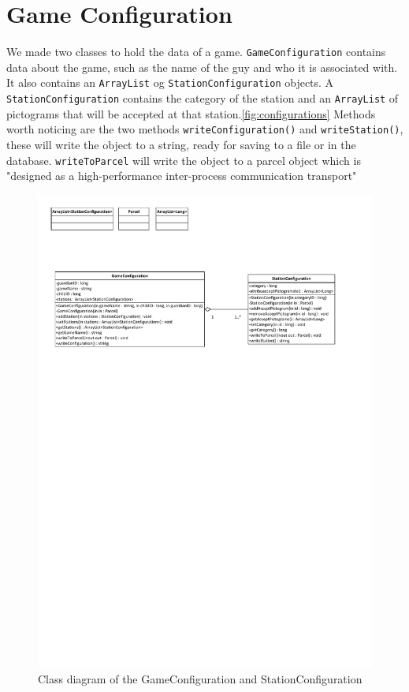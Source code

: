 \section{Game Configuration}
\label{gameconfiguration}
We made two classes to hold the data of a game. \lstinline|GameConfiguration| contains data about the game, such as the name of the guy and who it is associated with. It also contains an \lstinline|ArrayList| og \lstinline|StationConfiguration| objects. A \lstinline|StationConfiguration| contains the category of the station and an \lstinline|ArrayList| of pictograms that will be accepted at that station.\autoref{fig:configurations}
Methods worth noticing are the two methods \lstinline|writeConfiguration()| and \lstinline|writeStation()|, these will write the object to a string, ready for saving to a file or in the database. \lstinline|writeToParcel| will write the object to a parcel object which is "designed as a high-performance inter-process communication transport"\citep{parcel}
\begin{figure}[H]
\includegraphics[width=1.0\linewidth,page=2]{img/configurations.pdf}%
\caption{Class diagram of the GameConfiguration and StationConfiguration}
\label{fig:configurations}
\end{figure}

